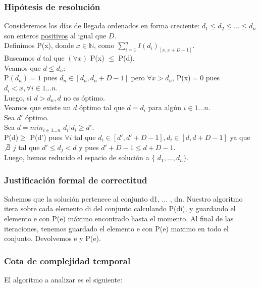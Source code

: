 \documentclass[11pt, a4paper, twoside]{article}
\begin{document}
\subsubsection{Hipótesis de resolución}
Consideremos los días de llegada ordenados en forma creciente: $d_1 \le d_2 \le \dots \le d_n$ son enteros \underline{positivos} al igual que $D$. \\
Definimos P(x), donde $x \in \mathbb{N}$, como $\sum_{i=1}^{n} I(d_i)_{[x,x+D-1]}$. \\
Buscamos $d$ tal que $(\forall x)$ P(x) $\le$ P(d). \\
Veamos que $d \le d_n$: \\
P$(d_n)=1$ pues $d_n \in [d_n,d_n + D - 1]$ pero $\forall x > d_n$, P(x)$=0$ pues $d_i < x, \forall i \in 1...n$.\\
Luego, si $d > d_n, d$ no es óptimo. \\
Veamos que existe un $d$ óptimo tal que $d=d_i$ para algún $i \in 1...n$. \\
Sea $d'$ óptimo. \\
Sea $d=min_{i \in 1...n}$ $d_i \big| d_i \ge d'$. \\
P(d)$\ge$ P(d') pues $\forall i$ tal que $d_i \in [d',d'+D-1], d_i \in [d,d+D-1]$ ya que $\not\exists$ $j$ tal que $d' \le d_j < d$ y pues $d'+D-1 \le d+D-1$. \\
Luego, hemos reducido el espacio de solución a $\{$ $d_1,...,d_n$$\}$.

\subsubsection{Justificación formal de correctitud}
Sabemos que la soluci\'on pertenece al conjunto {d1, ... , dn}. Nuestro algoritmo itera sobre cada elemento di del conjunto calculando P(di), y guardando el elemento e con P(e) m\'aximo encontrado hasta el momento. Al final de las iteraciones, tenemos guardado el elemento e con P(e) maximo en todo el conjunto. Devolvemos e y P(e).
\subsubsection{Cota de complejidad temporal}
El algoritmo a analizar es el siguiente:
\end{document}
